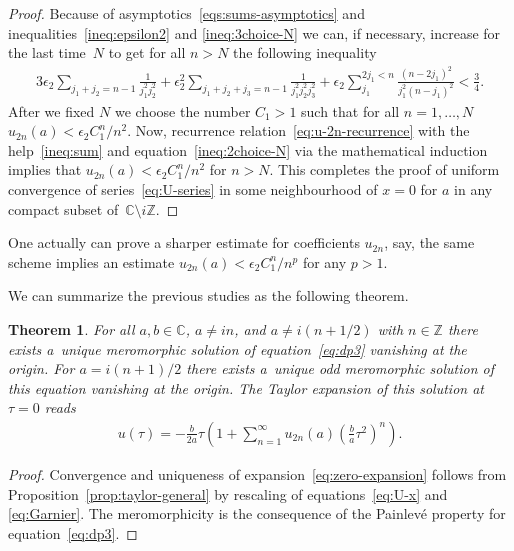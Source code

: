 \documentclass[pdftex]{sigma}
\numberwithin{equation}{section}
\newtheorem{Theorem}{Theorem}[section]
\begin{document}
\begin{proof}
Because of asymptotics~\eqref{eqs:sums-asymptotics} and inequalities~\eqref{ineq:epsilon2} and \eqref{ineq:3choice-N}
we can, if necessary, increase for the last time~$N$ to get for all $n>N$ the following inequality
\begin{gather}\label{ineq:sum}
3\epsilon_2\sum\limits_{j_1+j_2=n-1}\frac1{j_1^2 j_2^2}+\epsilon_2^2\sum\limits_{j_1+j_2+j_3=n-1}\frac1{j_1^2 j_2^2 j_3^2}+
\epsilon_2\sum\limits_{j_1}^{2j_1<n}\frac{(n-2j_1)^2}{j_1^2(n-j_1)^2}<\frac34.
\end{gather}
After we fixed $N$ we choose the number $C_1>1$ such that for all $n=1,\ldots,N$ $u_{2n}(a)< \epsilon_2C_1^n/n^2$.
Now, recurrence relation~\eqref{eq:u-2n-recurrence} with the help~\eqref{ineq:sum} and equation~\eqref{ineq:2choice-N}
via the mathematical induction implies that $u_{2n}(a)< \epsilon_2C_1^n/n^2$ for $n>N$. This completes the proof of
uniform convergence of series~\eqref{eq:U-series} in some neighbourhood of $x=0$ for $a$ in any compact subset of~$\mathbb{C}{\setminus} i\mathbb{Z}$.
\end{proof}

\begin{Remark}One actually can prove a sharper estimate for coefficients $u_{2n}$, say, the same scheme implies an estimate $u_{2n}(a)< \epsilon_2C_1^n/n^p$ for any $p>1$.
\end{Remark}

We can summarize the previous studies as the following theorem.
\begin{Theorem}\label{th:existence & uniqueness}
For all $a,b\in\mathbb C$, $a\neq in$, and $a\neq i(n+1/2)$ with $n\in\mathbb Z$ there exists a~unique
meromorphic solution of equation~\eqref{eq:dp3} vanishing at the origin. For $a=i(n+1)/2$ there exists a~unique odd meromorphic solution of this equation vanishing at the origin.
The Taylor expansion of this solution at $\tau=0$ reads
\begin{gather}\label{eq:zero-expansion}
u(\tau)=-\frac{b}{2a}\tau\left(1+\sum\limits_{n=1}^{\infty}u_{2n}(a)\left(\frac{b}{a}\tau^2\right)^n\right).
\end{gather}
\end{Theorem}
\begin{proof}Convergence and uniqueness of expansion~\eqref{eq:zero-expansion} follows from Proposition~\ref{prop:taylor-general}
by resca\-ling of equations~\eqref{eq:U-x} and \eqref{eq:Garnier}. The meromorphicity is the consequence of
the Painlev\'e property for equation~\eqref{eq:dp3}.
\end{proof}
\end{document}
